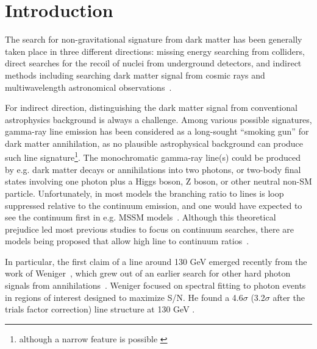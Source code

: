 \documentclass[aps,twocolumn,prd,superscriptaddress,showpacs,nofootinbib,fixfloat]{revtex4}
\begin{document}
\maketitle




\section{Introduction}


The search for non-gravitational signature from dark matter
has been generally taken place in three different
directions: missing energy searching from colliders, direct
searches for the recoil of nuclei from underground detectors,
and indirect methods including searching dark matter signal
from cosmic rays and multiwavelength astronomical
observations~\citep{Jungman:1995df,Bergstrom:2000,Bertone:2005,Hooper:2007Review, 2012arXiv1205.4882B}.

For indirect direction, distinguishing the dark matter
signal from conventional astrophysics background is always a
challenge. Among various possible signatures, gamma-ray line
emission has been considered as a long-sought ``smoking
gun'' for dark matter annihilation, as no plausible
astrophysical background can produce such line
signature\footnote{although a narrow feature is possible
  \citep[see][]{2012arXiv1207.0458A}}.  The monochromatic
gamma-ray line(s) could be produced by e.g. dark matter
decays or annihilations into two photons, or two-body final
states involving one photon plus a Higgs boson, Z boson, or
other neutral non-SM particle. Unfortunately, in most models the
branching ratio to lines is loop suppressed relative to the
continuum emission, and one would have expected to see the
continuum first in e.g. MSSM
models~\citep[e.g.][]{Bergstrom:1997}.  Although this
theoretical prejudice led most previous studies to focus on
continuum searches, there are models being proposed that
allow high line to continuum
ratios~\citep[e.g.][]{Bergstrom:1998, Bergstrom:2000,
  Bertone:2009, Jackson:2010, Cline:2012, Weiner:2012}.

In particular, the first claim of a line around 130 GeV emerged recently
from the work of Weniger~\citep{Weniger:2012}, which grew out of an
earlier search for other hard photon signals from
annihilations~\citep{Bringmann:2012}.  Weniger focused on
spectral fitting to photon events in regions of interest
designed to maximize S/N.  He found a 4.6$\sigma$
(3.2$\sigma$ after the trials factor correction) line
structure at 130 GeV .
\end{document}
